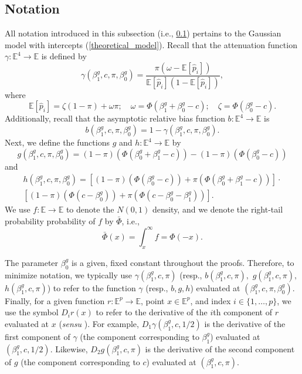\documentclass[12pt]{article}
\begin{document}
\begin{appendices}
\begin{refsection}
		\subsection{Notation}\label{sec:notation}
		All notation introduced in this subsection (i.e., \ref{sec:notation}) pertains to the Gaussian model with intercepts (\ref{theoretical_model}). Recall that the attenuation function $\gamma: \mathbb{E}^4 \to \mathbb{E}$ is defined by
		$$ \gamma(\beta^g_1, c, \pi, \beta^g_0) = \frac{\pi(\omega - \mathbb{E}[\hat{p}_i])}{ \mathbb{E}[\hat{p}_i](1 -\mathbb{E}[\hat{p}_i])},$$ where $$\mathbb{E}[\hat{p}_i] = \zeta(1-\pi) + \omega\pi; \quad \omega = \Phi\left(\beta_1^g + \beta_0^g - c \right); \quad \zeta = \Phi\left( \beta^g_0 - c \right).$$ Additionally, recall that the asymptotic relative bias function $b: \mathbb{E}^4 \to \mathbb{E}$ is
		$$ b(\beta^g_1, c, \pi, \beta^g_0) = 1 - \gamma(\beta^g_1, c, \pi, \beta^g_0).$$ Next, we define the functions $g$ and $h: \mathbb{E}^4 \to \mathbb{E}$ by
		\begin{equation}\label{def_g}
		g(\beta^g_1, c, \pi, \beta^g_0) = (1-\pi)\left( \Phi(\beta_0^g + \beta_1^g - c)\right) - (1-\pi)\left(\Phi(\beta_0^g - c)\right)\end{equation}
		and
		\begin{multline}\label{def_h}
		h(\beta^g_1, c, \pi, \beta^g_0) = \left[(1-\pi)\left( \Phi(\beta_0^g - c)\right) + \pi\left(\Phi(\beta^g_0 + \beta^g_1 - c) \right) \right] \cdot \\ \left[(1-\pi)\left( \Phi(c - \beta^g_0) \right) + \pi\left(\Phi(c - \beta_0^g - \beta_1^g) \right) \right].
		\end{multline}
		We use $f:\mathbb{E} \to \mathbb{E}$ to denote the $N(0,1)$ density, and we denote the right-tail probability probability of $f$ by $\bar{\Phi}$, i.e.,
		$$\bar{\Phi}(x) = \int_{x}^{\infty} f = \Phi(-x).$$
		
		The parameter $\beta^g_0$ is a given, fixed constant throughout the proofs. Therefore, to minimize notation, we typically use $\gamma(\beta^g_1, c, \pi)$ (resp., $b(\beta^g_1, c, \pi),$ $g(\beta^g_1, c, \pi),$ $h(\beta^g_1, c, \pi)$) to refer to the function $\gamma$ (resp., $b, g, h$) evaluated at $(\beta^g_1, c, \pi, \beta^g_0)$. Finally, for a given function $r: \mathbb{E}^{p} \to \mathbb{E}$, point $x \in \mathbb{E}^p$, and index $i \in \{1, \dots, p\}$, we use the symbol $D_i r(x)$ to refer to the derivative of the $i$th component of $r$ evaluated at $x$ (\textit{sensu} \cite{fitzpatrick2009}). For example, $D_1 \gamma(\beta^g_1, c, 1/2)$ is the derivative of the first component of $\gamma$ (the component corresponding to $\beta^g_1$) evaluated at $(\beta^g_1, c, 1/2)$. Likewise,  $D_2g(\beta^g_1, c, \pi)$ is the derivative of the second component of $g$ (the component corresponding to $c$) evaluated at $(\beta^g_1, c, \pi).$
		

\end{refsection}
\end{appendices}
\end{document}
